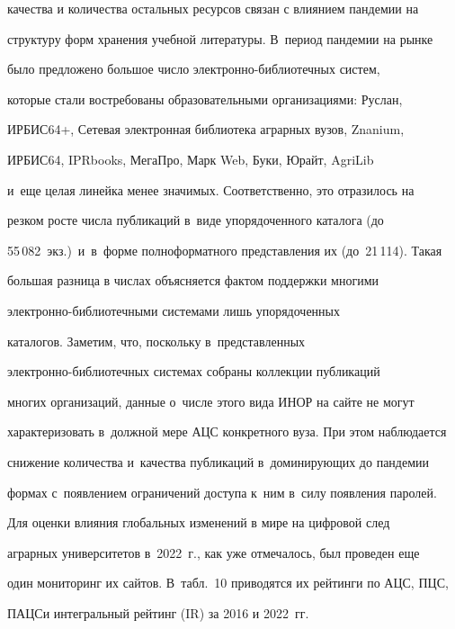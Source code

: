 качества и количества остальных ресурсов связан с влиянием пандемии на 


структуру форм хранения учебной литературы. В~период пандемии на рынке 


было предложено большое число элект\-рон\-но-биб\-лио\-теч\-ных сис\-тем, 


которые стали востребованы образовательными организациями: Руслан, 


\mbox{ИРБИС64+}, Сетевая электронная библиотека аграрных вузов, Znanium, 


ИРБИС64, \mbox{IPRbooks}, \mbox{МегаПро}, Марк Web, Буки, Юрайт, AgriLib 


и~еще целая линейка менее значимых. Соответственно, это отразилось на 


резком росте числа публикаций в~виде упорядоченного каталога (до 


55\,082~экз.)\ и~в~форме полноформатного представления их (до~21\,114). Такая 


большая разница в числах объясняется фактом поддержки многими  


элект\-рон\-но-биб\-лио\-теч\-ны\-ми сис\-те\-ма\-ми лишь упорядоченных 


каталогов. Заметим, что, поскольку в~представленных  


элект\-рон\-но-биб\-лио\-теч\-ных сис\-те\-мах собраны коллекции публикаций 


многих организаций, данные о~числе этого вида ИНОР на сайте не могут 


характеризовать в~должной мере АЦС конкретного вуза. При этом наблюдается 


снижение количества и~качества публикаций в~доминирующих до пандемии 


формах с~появлением ограничений доступа к~ним в~силу появления паролей.











  


  Для оценки влияния глобальных изменений в мире на цифровой след 


аграрных университетов в~2022~г., как уже отмечалось, был проведен еще 


один мониторинг их сайтов. В~табл.~10 приводятся их рейтинги по АЦС, ПЦС, 


ПАЦСи интегральный рейтинг (IR) за 2016 и 2022~гг.



